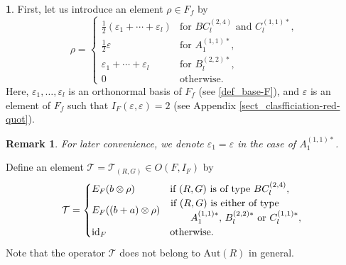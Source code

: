 \documentclass[11pt]{amsart}
\newtheorem{rem}[thm]{Remark}%
\begin{document}
{{\vskip 3mm
\noindent
{\bf 1}. First, let us introduce an element $\rho\in F_f$ by
\begin{equation*}\label{eqn:rho}
\rho=\begin{cases}
\tfrac{1}{2}(\varepsilon_1+\cdots+\varepsilon_l) & 
\mbox{for $BC_l^{(2,4)}$ and $C_l^{(1,1)\ast}$},\\
\tfrac12 \varepsilon & \mbox{for $A_1^{(1,1)\ast}$},\\ 
\varepsilon_1+\cdots+\varepsilon_l& 
\mbox{for $B_l^{(2,2)\ast}$},\\
0 & \mbox{otherwise}.
\end{cases}
\end{equation*}
Here, $\varepsilon_1,\ldots, \varepsilon_l$ is an orthonormal basis of $F_f$ 
(see \eqref{def_base-F}), and
$\varepsilon$ is an element of $F_f$ such that $I_F(\varepsilon,\varepsilon) = 2$
(see Appendix \ref{sect_clasfficiation-red-quot}).
\begin{rem}
For later convenience, we denote $\varepsilon_1=\varepsilon$ in the case of 
$A_1^{(1,1)\ast}$.  
\end{rem}
Define an element $\mathcal{T}=\mathcal{T}_{(R,G)}\in 
O(F,I_F)$ by
\begin{equation*}\label{eqn:T}
\mathcal{T}=\begin{cases}
E_F(b\otimes \rho) & \mbox{if $(R,G)$ is of type $BC_l^{(2,4)}$},\\
E_F((b+a)\otimes \rho) & 
\!\!\! \hspace*{0.2mm}\begin{array}{l}\mbox{if $(R,G)$ is either of type}\\
\qquad \mbox{$A_1^{(1,1)\ast}$, $B_l^{(2,2)\ast}$ or $C_l^{(1,1)\ast}$,}
\end{array}\\
\mathrm{id}_F & \mbox{otherwise}.
\end{cases}
\end{equation*}
Note that the operator $\mathcal{T}$ does not belong to $\mathrm{Aut}(R)$ in general. 
\\

}}
\end{document}
